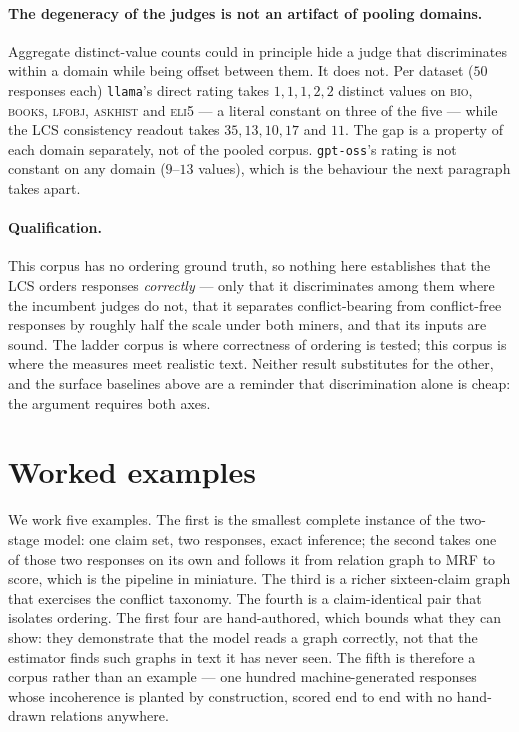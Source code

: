 \paragraph{The degeneracy of the judges is not an artifact of pooling domains.} Aggregate
distinct-value counts could in principle hide a judge that discriminates within a domain while being
offset between them. It does not. Per dataset ($50$ responses each) \texttt{llama}'s direct rating takes
$1, 1, 1, 2, 2$ distinct values on \textsc{bio}, \textsc{books}, \textsc{lfobj}, \textsc{askhist} and
\textsc{eli5} --- a literal constant on three of the five --- while the LCS consistency readout takes
$35, 13, 10, 17$ and $11$. The gap is a property of each domain separately, not of the pooled corpus.
\texttt{gpt-oss}'s rating is not constant on any domain ($9$--$13$ values), which is the behaviour the
next paragraph takes apart.

\paragraph{Qualification.} This corpus has no ordering ground truth, so nothing here
establishes that the LCS orders responses \emph{correctly} --- only that it discriminates among them
where the incumbent judges do not, that it separates conflict-bearing from conflict-free responses by
roughly half the scale under both miners, and that its inputs are sound. The ladder corpus is where
correctness of ordering is tested; this corpus is where the measures meet realistic text. Neither result
substitutes for the other, and the surface baselines above are a reminder that discrimination alone is
cheap: the argument requires both axes.


\section{Worked examples}
\label{sec-examples}

We work five examples. The first is the smallest complete instance of the two-stage model: one
claim set, two responses, exact inference; the second takes one of those two responses on its own
and follows it from relation graph to MRF to score, which is the pipeline in miniature. The third is
a richer sixteen-claim graph that exercises the conflict taxonomy. The fourth is a claim-identical
pair that isolates ordering. The first four are hand-authored, which bounds what they can show: they
demonstrate that the model reads a graph correctly, not that the estimator finds such graphs in text
it has never seen. The fifth is therefore a corpus rather than an example --- one hundred
machine-generated responses whose incoherence is planted by construction, scored end to end with no
hand-drawn relations anywhere.

